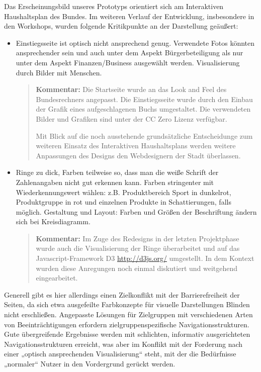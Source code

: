 \documentclass[11pt,a4paper,twoside]{article}
\newcommand{\kommentar}[1]{\begin{quote}\textbf{Kommentar:} #1 \end{quote}}
\begin{document}
Das Erscheinungsbild unseres Prototyps orientiert sich am Interaktiven
Haushaltsplan des Bundes. Im weiteren Verlauf der Entwicklung, insbesondere in
den Workshops, wurden folgende Kritikpunkte an der Darstellung geäußert:
\begin{itemize}\itemsep0pt
\item Einstiegsseite ist optisch nicht ansprechend genug.  Verwendete Fotos
  könnten ansprechender sein und auch unter dem Aspekt Bürgerbeteiligung als
  nur unter dem Aspekt Finanzen/Business ausgewählt werden.  Visualisierung
  durch Bilder mit Menschen. 

\kommentar{Die Startseite wurde an das Look and Feel des Bundesrechners
  angepasst. Die Einstiegsseite wurde durch den Einbau der Grafik eines
  aufgeschlagenen Buchs umgestaltet.  Die verwendeten Bilder und Grafiken sind
  unter der CC Zero Lizenz verfügbar.

  Mit Blick auf die noch ausstehende grundsätzliche Entscheidunge zum weiteren
  Einsatz des Interaktiven Haushaltsplans werden weitere Anpassungen des
  Designs den Webdesignern der Stadt überlassen. }

\item Ringe zu dick, Farben teilweise so, dass man die weiße Schrift der
  Zahlenangaben nicht gut erkennen kann. Farben stringenter mit
  Wiederkennungswert wählen: z.B. Produktbereich Sport in dunkelrot,
  Produktgruppe in rot und einzelnen Produkte in Schattierungen, falls
  möglich.  Gestaltung und Layout: Farben und Größen der Beschriftung ändern
  sich bei Kreisdiagramm.

\kommentar{Im Zuge des Redesigns in der letzten Projektphase wurde auch die
  Visualisierung der Ringe überarbeitet und auf das Javascript-Framework D3
  \url{http://d3js.org/} umgestellt.  In dem Kontext wurden diese Anregungen
  noch einmal diskutiert und weitgehend eingearbeitet.}
\end{itemize}
Generell gibt es hier allerdings einen Zielkonflikt mit der Barrierefreiheit
der Seiten, da sich etwa ausgefeilte Farbkonzepte für visuelle Darstellungen
Blinden nicht erschließen.  Angepasste Lösungen für Zielgruppen mit
verschiedenen Arten von Beeinträchtigungen erfordern zielgruppenspezifische
Navigationsstrukturen.  Gute übergreifende Ergebnisse werden mit schlichten,
informativ ausgerichteten Navigationsstrukturen erreicht, was aber im Konflikt
mit der Forderung nach einer „optisch ansprechenden Visualisierung“ steht, mit
der die Bedürfnisse „normaler“ Nutzer in den Vordergrund gerückt werden.
\end{document}
